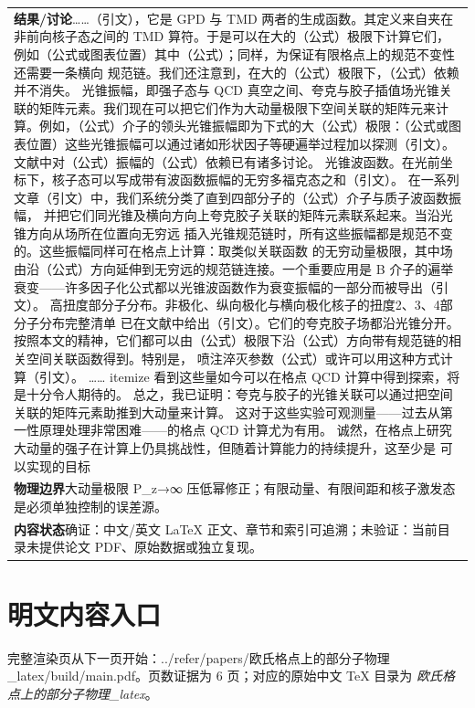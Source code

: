\documentclass[UTF8,11pt,oneside]{ctexbook}
\begin{document}
\begin{table}[htbp]
\begin{tabular}{@{}p{}@{}}
    \textbf{结果/讨论}\quad ……（引文），它是 GPD 与 TMD 两者的生成函数。其定义来自夹在非前向核子态之间的 TMD 算符。于是可以在大的（公式）极限下计算它们，例如（公式或图表位置）其中（公式）；同样，为保证有限格点上的规范不变性还需要一条横向 规范链。我们还注意到，在大的（公式）极限下，（公式）依赖并不消失。 光锥振幅，即强子态与 QCD 真空之间、夸克与胶子插值场光锥关联的矩阵元素。我们现在可以把它们作为大动量极限下空间关联的矩阵元来计算。例如，（公式）介子的领头光锥振幅即为下式的大（公式）极限：（公式或图表位置）这些光锥振幅可以通过诸如形状因子等硬遍举过程加以探测（引文）。 文献中对（公式）振幅的（公式）依赖已有诸多讨论。 光锥波函数。在光前坐标下，核子态可以写成带有波函数振幅的无穷多福克态之和（引文）。 在一系列文章（引文）中，我们系统分类了直到四部分子的（公式）介子与质子波函数振幅， 并把它们同光锥及横向方向上夸克胶子关联的矩阵元素联系起来。当沿光锥方向从场所在位置向无穷远 插入光锥规范链时，所有这些振幅都是规范不变的。这些振幅同样可在格点上计算：取类似关联函数 的无穷动量极限，其中场由沿（公式）方向延伸到无穷远的规范链连接。一个重要应用是 B 介子的遍举衰变——许多因子化公式都以光锥波函数作为衰变振幅的一部分而被导出（引文）。 高扭度部分子分布。非极化、纵向极化与横向极化核子的扭度2、3、4部分子分布完整清单 已在文献中给出（引文）。它们的夸克胶子场都沿光锥分开。按照本文的精神，它们都可以由（公式）极限下沿（公式）方向带有规范链的相关空间关联函数得到。特别是， 喷注淬灭参数（公式）或许可以用这种方式计算（引文）。 …… itemize 看到这些量如今可以在格点 QCD 计算中得到探索，将是十分令人期待的。 总之，我已证明：夸克与胶子的光锥关联可以通过把空间关联的矩阵元素助推到大动量来计算。 这对于这些实验可观测量——过去从第一性原理处理非常困难——的格点 QCD 计算尤为有用。 诚然，在格点上研究大动量的强子在计算上仍具挑战性，但随着计算能力的持续提升，这至少是 可以实现的目标 \\
    \textbf{物理边界}\quad 大动量极限 P\_z→∞ 压低幂修正；有限动量、有限间距和核子激发态是必须单独控制的误差源。 \\
    \textbf{内容状态}\quad 确证：中文/英文 LaTeX 正文、章节和索引可追溯；未验证：当前目录未提供论文 PDF、原始数据或独立复现。 \\
    \bottomrule
  \end{tabular}
\end{table}
\section*{明文内容入口}
\noindent 完整渲染页从下一页开始：../\allowbreak{}refer/\allowbreak{}papers/\allowbreak{}欧氏格点上的部分子物理\_\allowbreak{}latex/\allowbreak{}build/\allowbreak{}main.pdf。页数证据为 6 页；对应的原始中文 TeX 目录为 \emph{欧氏格点上的部分子物理\_latex}。
\clearpage

\clearpage
\end{document}
